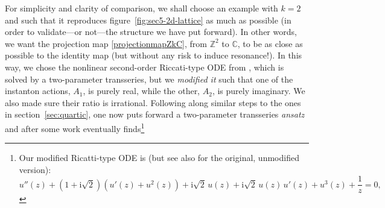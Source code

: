 \documentclass[11pt,a4paper]{article}
\def\BZ{{\mathbb Z}}
\def\BC{{\mathbb C}}
\begin{document}
For simplicity and clarity of comparison, we shall choose an example with $k=2$ and such that it reproduces figure~\ref{fig:sec5-2d-lattice} as much as possible (in order to validate---or not---the structure we have put forward). In other words, we want the projection map \eqref{projectionmapZkC}, from $\BZ^2$ to $\BC$, to be as close as possible to the identity map (but without any risk to induce resonance!). In this way, we chose the nonlinear second-order Riccati-type ODE from \cite{o05b}, which is solved by a two-parameter transseries, but we \textit{modified it} such that one of the instanton actions, $A_{1}$, is purely real, while the other, $A_{2}$, is purely imaginary. We also made sure their ratio is irrational. Following along similar steps to the ones in section~\ref{sec:quartic}, one now puts forward a two-parameter transseries \textit{ansatz} and after some work eventually finds\footnote{Our modified Ricatti-type ODE is (but see also \cite{o05b} for the original, unmodified version):
%
\begin{equation}
u'' (z) + \left( 1+\mathrm{i}\sqrt{2} \right) \left( u' (z) + u^2 (z) \right) + \mathrm{i}\sqrt{2}\, u (z) + \mathrm{i}\sqrt{2}\, u (z)\, u' (z) + u^3 (z) + \frac{1}{z} = 0,
\end{equation}
%
\noindent
}
\end{document}
